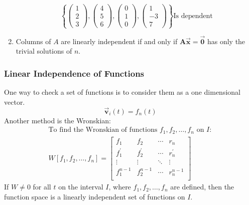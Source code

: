 \documentclass[12pt, landscape, twocolumn]{article}
\let\oldvec\vec
\renewcommand{\vec}[1]{\oldvec{\mathbf{ #1 } } }                    %
\begin{document}
\begin{enumerate}
            \[
                \left\{
                \left(\begin{array}{c}
                    1\\
                    2\\
                    3
                \end{array}\right),
                \left(\begin{array}{c}
                    4\\
                    5\\
                    6
                \end{array}\right),
                \left(\begin{array}{c}
                    0\\
                    1\\
                    0
                \end{array}\right),
                \left(\begin{array}{c}
                    1\\
                    -3\\
                    7
                \end{array}\right)
                \right\} \text{Is dependent}
            \]
        \item Columns of $A$ are linearly independent if and only if $\mathbf{A}\vec{x} = \vec{0}$ has only the trivial solutions of $n$.
        \end{enumerate}

        \subsubsection{Linear Independence of Functions}
        One way to check a set of functions is to consider them as a one dimensional vector.
        \[
            \vec{v}_i (t) = f_n(t)
        \]
        Another method is the Wronskian:
        \begin{equation}\label{eq:wronskian}
        \begin{aligned}
            \text{To find the Wronskian of functions } f_1, f_2, \ldots, f_n \text{ on } I:\\
            W[f_1, f_2, \ldots, f_n] = \left[ \begin{array}{cccc}
                    f_1 & f_2 & \cdots & r_n\\
                    f^{'}_1 & f^{'}_2 & \cdots & r^{'}_n\\
                    \vdots & \vdots & \ddots & \vdots\\
                    f^{n-1}_1 & f^{n-1}_2 & \cdots & r^{n-1}_n\\
            \end{array} \right]
        \end{aligned}
        \end{equation}
        If $W \neq 0$ for all $t$ on the interval $I$, where $f_1, f_2, \ldots, f_n$ are defined, then the function space is a linearly independent set of functions on $I$.
\end{document}
